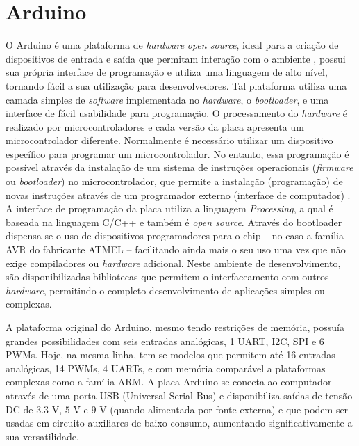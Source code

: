 \section{Arduino}

   O Arduino é uma plataforma de \textit{hardware} \textit{open source}, ideal para a criação de dispositivos de entrada e saída que permitam interação com o ambiente \cite{arduino}, possui sua própria interface de programação e utiliza uma linguagem de alto nível, tornando fácil a sua utilização para desenvolvedores. Tal plataforma utiliza uma camada simples de \textit{software} implementada no \textit{hardware}, o \textit{bootloader}, e uma interface de fácil usabilidade para programação. O processamento do \textit{hardware} é realizado por microcontroladores e cada versão da placa apresenta um microcontrolador diferente. Normalmente é necessário utilizar um dispositivo específico para programar um microcontrolador. No entanto, essa programação é possível através da instalação de um sistema de instruções operacionais (\textit{firmware} ou \textit{bootloader}) no microcontrolador, que permite a instalação (programação) de novas instruções através de um programador externo (interface de computador) \cite{arduinocc_bootloader}. A interface de programação da placa utiliza a linguagem \textit{Processing}, a qual é baseada na linguagem C/C++ e também é \textit{open source}. Através do bootloader dispensa-se o uso de dispositivos programadores para o chip -- no caso a família AVR do fabricante ATMEL -- facilitando ainda mais o seu uso uma vez que não exige compiladores ou \textit{hardware} adicional. Neste ambiente de desenvolvimento, são disponibilizadas bibliotecas que permitem o interfaceamento com outros \textit{hardware}, permitindo o completo desenvolvimento de aplicações simples ou complexas.

   A plataforma original do Arduino, mesmo tendo restrições de memória, possuía grandes possibilidades com seis entradas analógicas, 1 UART, I2C, SPI e 6 PWMs. Hoje, na mesma linha, tem-se modelos que permitem até 16 entradas analógicas, 14 PWMs, 4 UARTs, e com memória comparável a plataformas complexas como a família ARM. A placa Arduino se conecta ao computador através de uma porta USB (Universal Serial Bus)  e disponibiliza saídas de tensão DC de $3.3$ V, $5$ V e $9$ V (quando alimentada por fonte externa) e que podem ser usadas em circuito auxiliares de baixo consumo, aumentando significativamente a sua versatilidade.
   
   
